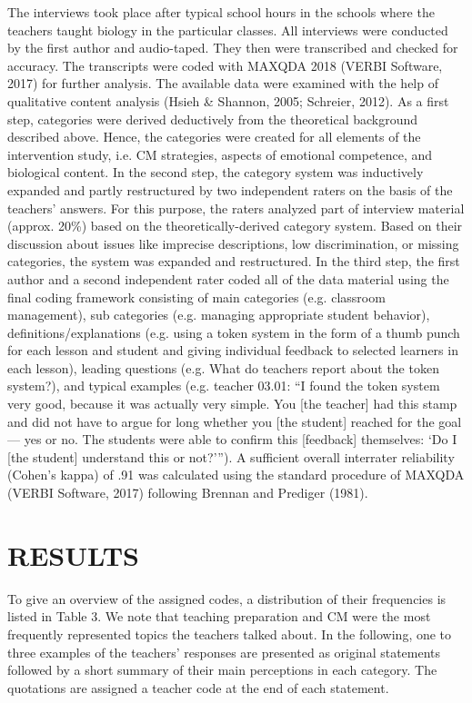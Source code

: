 \documentclass[11.5pt]{sig-alternate} %
\begin{document}
\begin{large}
The interviews took place after typical school hours in the schools where the teachers taught biology in the particular classes. All interviews were conducted by the first author and audio-taped. They then were transcribed and checked for accuracy. The transcripts were coded with MAXQDA 2018 (VERBI Software, 2017) for further analysis. The available data were examined with the help of qualitative content analysis (Hsieh \& Shannon, 2005; Schreier, 2012). As a first step, categories were derived deductively from the theoretical background described above. Hence, the categories were created for all elements of the intervention study, i.e. CM strategies, aspects of emotional competence, and biological content. In the second step, the category system was inductively expanded and partly restructured by two independent raters on the basis of the teachers’ answers. For this purpose, the raters analyzed part of interview material (approx. 20\%) based on the theoretically-derived category system. Based on their discussion about issues like imprecise descriptions, low discrimination, or missing categories, the system was expanded and restructured. In the third step, the first author and a second independent rater coded all of the data material using the final coding framework consisting of main categories (e.g. classroom management), sub categories (e.g. managing appropriate student behavior), definitions/explanations (e.g. using a token system in the form of a thumb punch for each lesson and student and giving individual feedback to selected learners in each lesson), leading questions (e.g. What do teachers report about the token system?), and typical examples (e.g. teacher 03.01: “I found the token system very good, because it was actually very simple. You [the teacher] had this stamp and did not have to argue for long whether you [the student] reached for the goal— yes or no. The students were able to confirm this [feedback] themselves: ‘Do I [the student] understand this or not?’”). A sufficient overall interrater reliability (Cohen’s kappa) of .91 was calculated using the standard procedure of MAXQDA (VERBI Software, 2017) following Brennan and Prediger (1981).

\section*{RESULTS}

To give an overview of the assigned codes, a distribution of their frequencies is listed in Table 3. We note that teaching preparation and CM were the most frequently represented topics the teachers talked about. In the following, one to three examples of the teachers’ responses are presented as original statements followed by a short summary of their main perceptions in each category. The quotations are assigned a teacher code at the end of each statement.


\end{large}
\end{document}
